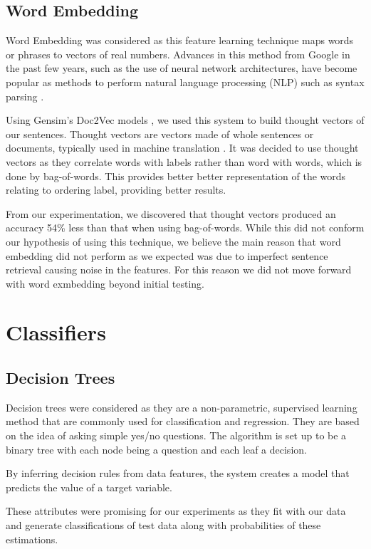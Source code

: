 \documentclass[bsc,frontabs,twoside,singlespacing,parskip,deptreport]{infthesis}     %
\begin{document}
\subsection{Word Embedding} \label{sec:word-embedding}
Word Embedding was considered as this feature learning technique maps words or phrases to vectors of real numbers.
Advances in this method from Google in the past few years, such as the use of neural network architectures, have become
popular as methods to perform natural language processing (NLP) such as syntax parsing \cite{socher2013parsing}.

Using Gensim's Doc2Vec models \cite{rehurek_lrec}, we used this system to build thought vectors of our sentences.
Thought vectors are vectors made of whole sentences or documents, typically used in machine translation \cite{deeplearning4j}.
It was decided to use thought vectors as they correlate words with labels rather than word with words, which is done by bag-of-words.
This provides better better representation of the words relating to ordering label, providing better results.



From our experimentation, we discovered that thought vectors produced an accuracy 54\% less than that when
using bag-of-words. While this did not conform our hypothesis of using this technique, we believe
the main reason that word embedding did not perform as we expected was due to imperfect sentence retrieval causing noise in
the features. For this reason we did not move forward with word exmbedding beyond initial testing.

\section{Classifiers}\label{sec:classifiers}
\subsection{Decision Trees}
Decision trees were considered as they are a non-parametric, supervised learning method that are commonly used for
classification and regression.
They are based on the idea of asking simple yes/no questions. The algorithm is set up to be a binary tree with
each node being a question and each leaf a decision.

By inferring decision rules from data features, the system creates a model that predicts the value of a target variable.

These attributes were promising for our experiments as they fit with our data and generate
classifications of test data along with probabilities of these estimations.
\end{document}
